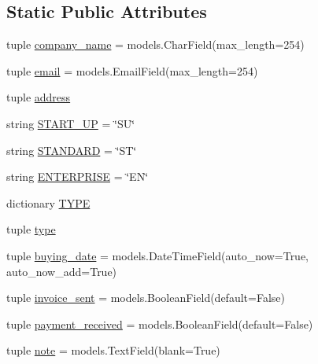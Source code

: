 \subsection*{Static Public Attributes}
\begin{DoxyCompactItemize}
\item 
tuple \hyperlink{classcompanies_1_1models_1_1_project_package_a1b01856b8e731f478ec1d62e9f30c243}{company\-\_\-name} = models.\-Char\-Field(max\-\_\-length=254)
\item 
tuple \hyperlink{classcompanies_1_1models_1_1_project_package_a01c9036f837e5c6e355b70ca19687a7c}{email} = models.\-Email\-Field(max\-\_\-length=254)
\item 
tuple \hyperlink{classcompanies_1_1models_1_1_project_package_a26aff808789e2c1b012cc1ab4dd760cf}{address}
\item 
string \hyperlink{classcompanies_1_1models_1_1_project_package_abb811d94ba61f0b7c3dc09f240b852ca}{S\-T\-A\-R\-T\-\_\-\-U\-P} = \char`\"{}S\-U\char`\"{}
\item 
string \hyperlink{classcompanies_1_1models_1_1_project_package_a573df38af12b97226c325927cf209edb}{S\-T\-A\-N\-D\-A\-R\-D} = \char`\"{}S\-T\char`\"{}
\item 
string \hyperlink{classcompanies_1_1models_1_1_project_package_a1925fa8a74daaa3e56b1a3812db55944}{E\-N\-T\-E\-R\-P\-R\-I\-S\-E} = \char`\"{}E\-N\char`\"{}
\item 
dictionary \hyperlink{classcompanies_1_1models_1_1_project_package_ab94641bdf922977860a1798e9c315838}{T\-Y\-P\-E}
\item 
tuple \hyperlink{classcompanies_1_1models_1_1_project_package_a473a942937dd3cd4c5d14d608944c2b6}{type}
\item 
tuple \hyperlink{classcompanies_1_1models_1_1_project_package_afabcd61d965eb709da9dd1e28ce306f4}{buying\-\_\-date} = models.\-Date\-Time\-Field(auto\-\_\-now=True, auto\-\_\-now\-\_\-add=True)
\item 
tuple \hyperlink{classcompanies_1_1models_1_1_project_package_a599168024fc8205661a532b00cbe98e6}{invoice\-\_\-sent} = models.\-Boolean\-Field(default=False)
\item 
tuple \hyperlink{classcompanies_1_1models_1_1_project_package_a7a4405ef61f95f7aa21d8b9a2e11b8f4}{payment\-\_\-received} = models.\-Boolean\-Field(default=False)
\item 
tuple \hyperlink{classcompanies_1_1models_1_1_project_package_ae51d4824b5222f8bec6e3d5169c827c1}{note} = models.\-Text\-Field(blank=True)
\end{DoxyCompactItemize}


